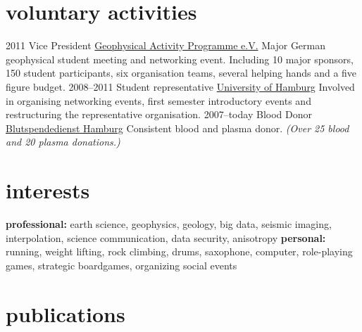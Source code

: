 \documentclass[]{friggeri-cv} %
\begin{document}
\section{voluntary activities}
\begin{entrylist}
\entry
{2011}
{Vice President}
{\href{http://www.geophysikstudenten.de/studentisches/gap}{Geophysical Activity Programme e.V.}}
{Major German geophysical student meeting and networking event. Including 10 major sponsors, 150 student participants, six organisation teams, several helping hands and a five figure budget.}
\entry
{2008--2011}
{Student representative}
{\href{http://geophysics.zmaw.de/index.php?id=fs}{University of Hamburg}}
{Involved in organising networking events, first semester introductory events and restructuring the representative organisation.}
\entry
{2007--today}
{Blood Donor}
{\href{http://www.blutspendediensthamburg.de}{Blutspendedienst Hamburg}}
{Consistent blood and plasma donor. \emph{(Over 25 blood and 20 plasma donations.)}}
\end{entrylist}
\section{interests}

\textbf{professional:} earth science, geophysics, geology, big data, seismic imaging, interpolation, science communication, data security, anisotropy \textbf{personal:} running, weight lifting, rock climbing, drums, saxophone, computer, role-playing games, strategic boardgames, organizing social events


\section{publications}



\begin{refsection}
\nocite{*}
\printbibliography[type=inproceedings, title={international peer-reviewed conferences/proceedings}, heading=subbibliography]
\end{refsection}
\clearpage
{} %
\end{document}
